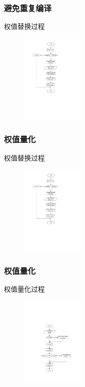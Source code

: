 \documentclass[12pt]{ctexbeamer}
\begin{document}
\begin{frame}
  \frametitle{避免重复编译}
    权值替换过程
    \begin{figure}
	  \includegraphics[width=0.28\textwidth]{figures/weight_replace_process.pdf}
    \end{figure}
\end{frame}

\begin{frame}
  \frametitle{权值量化}
    权值替换过程
    \begin{figure}
	  \includegraphics[width=0.28\textwidth]{figures/weight_replace_process.pdf}
    \end{figure}
\end{frame}

\begin{frame}
  \frametitle{权值量化}
    权值量化过程
    \begin{figure}
	  \includegraphics[width=0.28\textwidth]{figures/weight_quant_process.pdf}
    \end{figure}
\end{frame}
\end{document}

